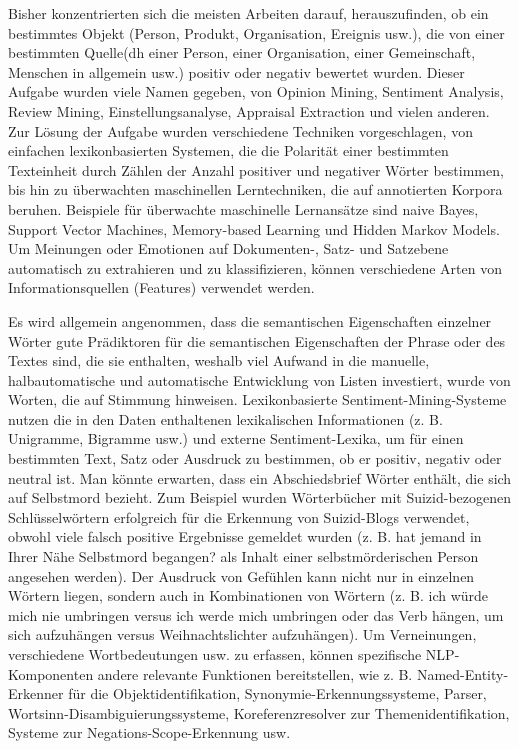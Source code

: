 \documentclass[conference]{IEEEtran}
\begin{document}
Bisher konzentrierten sich die meisten Arbeiten darauf, herauszufinden, ob ein bestimmtes Objekt (Person, Produkt, Organisation, Ereignis usw.), die von einer bestimmten Quelle(dh einer Person, einer Organisation, einer Gemeinschaft, Menschen in allgemein usw.) positiv oder negativ bewertet wurden. Dieser Aufgabe wurden viele Namen gegeben, von Opinion Mining, Sentiment Analysis, Review Mining, Einstellungsanalyse, Appraisal Extraction und vielen anderen. Zur Lösung der Aufgabe wurden verschiedene Techniken vorgeschlagen, von einfachen lexikonbasierten Systemen, die die Polarität einer bestimmten Texteinheit durch Zählen der Anzahl positiver und negativer Wörter bestimmen, bis hin zu überwachten maschinellen Lerntechniken, die auf annotierten Korpora beruhen. Beispiele für überwachte maschinelle Lernansätze sind naive Bayes, Support Vector Machines, Memory-based Learning und Hidden Markov Models. Um Meinungen oder Emotionen auf Dokumenten-, Satz- und Satzebene automatisch zu extrahieren und zu klassifizieren, können verschiedene Arten von Informationsquellen (Features) verwendet werden.\cite{b4}

Es wird allgemein angenommen, dass die semantischen Eigenschaften einzelner Wörter gute Prädiktoren für die semantischen Eigenschaften der Phrase oder des Textes sind, die sie enthalten, weshalb viel Aufwand in die manuelle, halbautomatische und automatische Entwicklung von Listen investiert, wurde von Worten, die auf Stimmung hinweisen. Lexikonbasierte Sentiment-Mining-Systeme nutzen die in den Daten enthaltenen lexikalischen Informationen (z. B. Unigramme, Bigramme usw.) und externe Sentiment-Lexika, um für einen bestimmten Text, Satz oder Ausdruck zu bestimmen, ob er positiv, negativ oder neutral ist. Man könnte erwarten, dass ein Abschiedsbrief Wörter enthält, die sich auf Selbstmord bezieht. Zum Beispiel wurden Wörterbücher mit Suizid-bezogenen Schlüsselwörtern erfolgreich für die Erkennung von Suizid-Blogs verwendet, obwohl viele falsch positive Ergebnisse gemeldet wurden (z. B. hat jemand in Ihrer Nähe Selbstmord begangen? als Inhalt einer selbstmörderischen Person angesehen werden). Der Ausdruck von Gefühlen kann nicht nur in einzelnen Wörtern liegen, sondern auch in Kombinationen von Wörtern (z. B. ich würde mich nie umbringen versus ich werde mich umbringen oder das Verb hängen, um sich aufzuhängen versus Weihnachtslichter aufzuhängen). Um Verneinungen, verschiedene Wortbedeutungen usw. zu erfassen, können spezifische NLP-Komponenten andere relevante Funktionen bereitstellen, wie z. B. Named-Entity-Erkenner für die Objektidentifikation, Synonymie-Erkennungssysteme, Parser, Wortsinn-Disambiguierungssysteme, Koreferenzresolver zur Themenidentifikation, Systeme zur Negations-Scope-Erkennung usw.\cite{b4}
\end{document}
